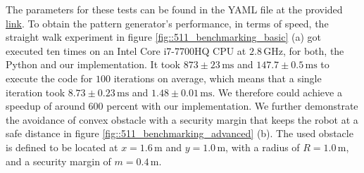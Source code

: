 The parameters for these tests can be found in the YAML file at the provided \href{https://github.com/mhubii/nmpc_pattern_generator/blob/719fde0bb73925923de85cbf379c5523e075dfeb/libs/pattern_generator/configs_hrp2.yaml#L1}{link}. To obtain the pattern generator's performance, in terms of speed, the straight walk experiment in figure \ref{fig::511_benchmarking_basic} (a) got executed ten times on an Intel Core i7-7700HQ CPU at $2.8\,\text{GHz}$, for both, the Python and our implementation. It took $873\pm23\,\text{ms}$ and $147.7\pm0.5\,\text{ms}$ to execute the code for $100$ iterations on average, which means that a single iteration took $8.73\pm0.23\,\text{ms}$ and $1.48\pm0.01\,\text{ms}$. We therefore could achieve a speedup of around $600$ percent with our implementation. We further demonstrate the avoidance of convex obstacle with a security margin that keeps the robot at a safe distance in figure \ref{fig::511_benchmarking_advanced} (b). The used obstacle is defined to be located at $x=1.6\,\text{m}$ and $y=1.0\,\text{m}$, with a radius of $R=1.0\,\text{m}$, and a security margin of $m=0.4\,\text{m}$.
